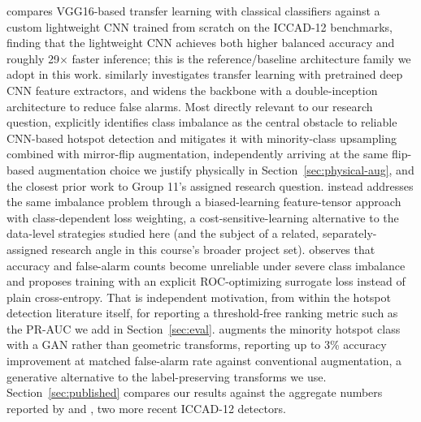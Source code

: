 \documentclass[conference]{IEEEtran}
\begin{document}
\cite{borisov2018} compares VGG16-based transfer learning with
classical classifiers against a custom lightweight CNN trained from
scratch on the ICCAD-12 benchmarks, finding that the lightweight CNN
achieves both higher balanced accuracy and roughly 29$\times$ faster
inference; this is the reference/baseline architecture family we
adopt in this work. \cite{liao2022transfer} similarly investigates
transfer learning with pretrained deep CNN feature extractors, and
\cite{chen2019inception} widens the backbone with a double-inception
architecture to reduce false alarms. Most directly relevant to our
research question, \cite{yang2017imbalance} explicitly identifies
class imbalance as the central obstacle to reliable CNN-based hotspot
detection and mitigates it with minority-class upsampling combined
with mirror-flip augmentation, independently arriving at the same
flip-based augmentation choice we justify physically in
Section~\ref{sec:physical-aug}, and the closest prior work to Group
11's assigned research question. \cite{yang2019biased} instead
addresses the same imbalance problem through a biased-learning
feature-tensor approach with class-dependent loss weighting, a
cost-sensitive-learning alternative to the data-level strategies
studied here (and the subject of a related, separately-assigned
research angle in this course's broader project set).
\cite{ye2019lithoroc} observes that accuracy and false-alarm counts
become unreliable under severe class imbalance and proposes training
with an explicit ROC-optimizing surrogate loss instead of plain
cross-entropy. That is independent motivation, from within the
hotspot detection literature itself, for reporting a threshold-free ranking
metric such as the PR-AUC we add in
Section~\ref{sec:eval}. \cite{wang2021gan} augments the minority
hotspot class with a GAN rather than geometric transforms, reporting
up to 3\% accuracy improvement at matched false-alarm rate against
conventional augmentation, a generative alternative to the
label-preserving transforms we use. Section~\ref{sec:published}
compares our results against the aggregate numbers reported by
\cite{huang2021enhancements} and \cite{lin2025yolov5}, two more recent
ICCAD-12 detectors.
\end{document}
